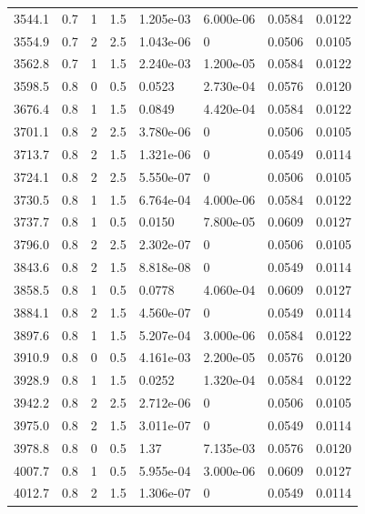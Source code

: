 \documentclass[preview]{standalone}
\begin{document}
{{{{\begin{tabular}{L{1.2cm}C{1.2cm} C{0.3cm}C{0.5cm} C{1.4cm}C{1.4cm} C{1.4cm}C{1.4cm}}
  3544.1  &   0.7  & 1     & 1.5 &  1.205e-03  & 6.000e-06  & 0.0584 &  0.0122   \\ 
  3554.9  &   0.7  & 2     & 2.5 &  1.043e-06  & 0  & 0.0506 &  0.0105   \\ 
  3562.8  &   0.7  & 1     & 1.5 &  2.240e-03  & 1.200e-05  & 0.0584 &  0.0122   \\ 
  3598.5  &   0.8  & 0     & 0.5 &  0.0523  & 2.730e-04  & 0.0576 &  0.0120   \\ 
  3676.4  &   0.8  & 1     & 1.5 &  0.0849  & 4.420e-04  & 0.0584 &  0.0122   \\ 
  3701.1  &   0.8  & 2     & 2.5 &  3.780e-06  & 0  & 0.0506 &  0.0105   \\ 
  3713.7  &   0.8  & 2     & 1.5 &  1.321e-06  & 0  & 0.0549 &  0.0114   \\ 
  3724.1  &   0.8  & 2     & 2.5 &  5.550e-07  & 0  & 0.0506 &  0.0105   \\ 
  3730.5  &   0.8  & 1     & 1.5 &  6.764e-04  & 4.000e-06  & 0.0584 &  0.0122   \\ 
  3737.7  &   0.8  & 1     & 0.5 &  0.0150  & 7.800e-05  & 0.0609 &  0.0127   \\ 
  3796.0  &   0.8  & 2     & 2.5 &  2.302e-07  & 0  & 0.0506 &  0.0105   \\ 
  3843.6  &   0.8  & 2     & 1.5 &  8.818e-08  & 0  & 0.0549 &  0.0114   \\ 
  3858.5  &   0.8  & 1     & 0.5 &  0.0778  & 4.060e-04  & 0.0609 &  0.0127   \\ 
  3884.1  &   0.8  & 2     & 1.5 &  4.560e-07  & 0  & 0.0549 &  0.0114   \\ 
  3897.6  &   0.8  & 1     & 1.5 &  5.207e-04  & 3.000e-06  & 0.0584 &  0.0122   \\ 
  3910.9  &   0.8  & 0     & 0.5 &  4.161e-03  & 2.200e-05  & 0.0576 &  0.0120   \\ 
  3928.9  &   0.8  & 1     & 1.5 &  0.0252  & 1.320e-04  & 0.0584 &  0.0122   \\ 
  3942.2  &   0.8  & 2     & 2.5 &  2.712e-06  & 0  & 0.0506 &  0.0105   \\ 
  3975.0  &   0.8  & 2     & 1.5 &  3.011e-07  & 0  & 0.0549 &  0.0114   \\ 
  3978.8  &   0.8  & 0     & 0.5 &  1.37  & 7.135e-03  & 0.0576 &  0.0120   \\ 
  4007.7  &   0.8  & 1     & 0.5 &  5.955e-04  & 3.000e-06  & 0.0609 &  0.0127   \\ 
  4012.7  &   0.8  & 2     & 1.5 &  1.306e-07  & 0  & 0.0549 &  0.0114   \\ 

\end{tabular}}}}}
\end{document}
